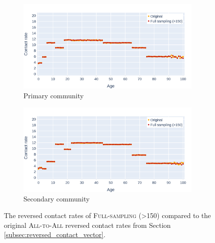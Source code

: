 \begin{figure}\ContinuedFloat
    \centering
    \begin{subfigure}{.8\linewidth}
        \centering
        \includegraphics[width=\textwidth]{4 - Sampling/fig/adjusted_full_sampling/fs_pSize_vs_standard_reverse_cr_primary.png}
        \caption{Primary community}
        \label{fig:fs_pSize_vs_standard_reversed_cr_primary}
    \end{subfigure}
    \begin{subfigure}{.8\linewidth}
        \centering
        \includegraphics[width=\textwidth]{4 - Sampling/fig/adjusted_full_sampling/fs_pSize_vs_standard_reverse_cr_secondary.png}
        \caption{Secondary community}
        \label{fig:fs_pSize_vs_standard_reversed_cr_secondary}
    \end{subfigure}
    \caption{The reversed contact rates of \textsc{Full-sampling (>150)} compared to the original \textsc{All-to-All} reversed contact rates from Section \ref{subsec:reversed_contact_vector}.}
    \label{fig:fs_pSize_vs_standard_reversed_cr}
\end{figure}

